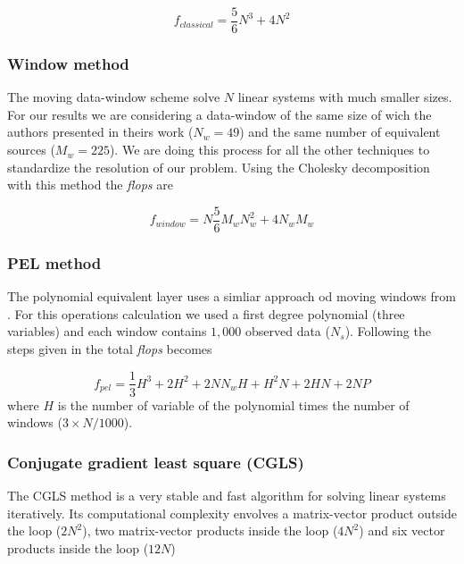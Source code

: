 \begin{equation}
	f_{classical} = \dfrac{5}{6} N^3 + 4N^2
\label{flops_classical}
\end{equation}

\subsubsection{Window method \citep{leao-silva1989}}

The moving data-window scheme \citep{leao-silva1989} solve $N$ linear systems with much smaller sizes. For our results we are considering a data-window of the same size of wich the authors presented in theirs work ($N_w = 49$) and the same number of equivalent sources ($M_w = 225$). We are doing this process for all the other techniques to standardize the resolution of our problem. Using the Cholesky decomposition with this method the \textit{flops} are

\begin{equation}
	f_{window} = N\dfrac{5}{6} M_w N_w^2 + 4N_w M_w
\label{flops_leao-silva}
\end{equation}

\subsubsection{PEL method \citep{oliveirajr-etal2013}}

The polynomial equivalent layer uses a simliar approach od moving windows from \cite{leao-silva1989}. For this operations calculation we used a first degree polynomial (three variables) and each window contains $1,000$ observed data ($N_s$). Following the steps given in \citep{oliveirajr-etal2013} the total \textit{flops} becomes

\begin{equation}
	f_{pel} = \dfrac{1}{3} H^3 + 2H^2 + 2NN_wH + H^2N + 2HN + 2NP
\label{flops_pel}
\end{equation}
where $H$ is the number of variable of the polynomial times the number of windows ($3 \times N/1000$).

\subsubsection{Conjugate gradient least square (CGLS)}

The CGLS method is a very stable and fast algorithm for solving linear systems iteratively. Its computational complexity envolves a matrix-vector product outside the loop ($2N^2$), two matrix-vector products inside the loop ($4N^2$) and six vector products inside the loop ($12N$) \citep{aster2018parameter}

